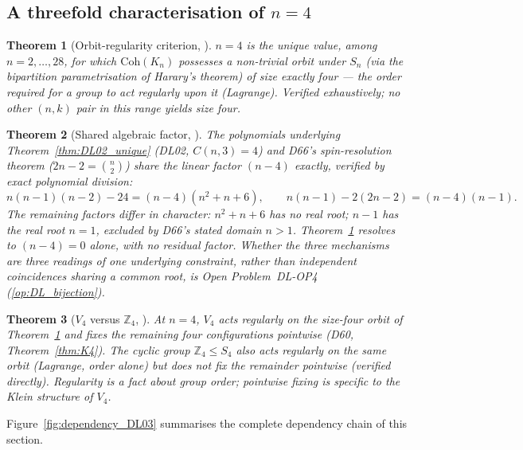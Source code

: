 \documentclass[11pt,a4paper]{article}
\theoremstyle{plain}
\newtheorem{theorem}{Theorem}[section]
\theoremstyle{definition}
\theoremstyle{remark}
\begin{document}
\subsection{A threefold characterisation of \texorpdfstring{$n=4$}{n=4}}

\begin{theorem}[Orbit-regularity criterion, \cite{DL03}]
\label{thm:DL03_orbit}
$n=4$ is the unique value, among $n=2,\ldots,28$, for which $\mathrm{Coh}(K_n)$ possesses a non-trivial orbit under $S_n$ (via the bipartition parametrisation of Harary's theorem) of size exactly four --- the order required for a group to act regularly upon it (Lagrange). Verified exhaustively; no other $(n,k)$ pair in this range yields size four.
\end{theorem}

\begin{theorem}[Shared algebraic factor, \cite{DL03}]
\label{thm:DL03_factorisation}
The polynomials underlying Theorem~\ref{thm:DL02_unique} (DL02, $C(n,3)=4$) and D66's spin-resolution theorem ($2n-2=\binom n2$) share the linear factor $(n-4)$ exactly, verified by exact polynomial division:
\begin{equation}
n(n-1)(n-2)-24 = (n-4)(n^2+n+6), \qquad n(n-1)-2(2n-2) = (n-4)(n-1).
\end{equation}
The remaining factors differ in character: $n^2+n+6$ has no real root; $n-1$ has the real root $n=1$, excluded by D66's stated domain $n>1$. Theorem~\ref{thm:DL03_orbit} resolves to $(n-4)=0$ alone, with no residual factor. Whether the three mechanisms are three readings of one underlying constraint, rather than independent coincidences sharing a common root, is Open Problem~DL-OP4 (\ref{op:DL_bijection}).
\end{theorem}

\begin{theorem}[\texorpdfstring{$V_4$}{V4} versus \texorpdfstring{$\mathbb{Z}_4$}{Z4}, \cite{DL03}]
\label{thm:DL03_v4z4}
At $n=4$, $V_4$ acts regularly on the size-four orbit of Theorem~\ref{thm:DL03_orbit} and fixes the remaining four configurations pointwise (D60, Theorem~\ref{thm:K4}). The cyclic group $\mathbb{Z}_4\le S_4$ also acts regularly on the same orbit (Lagrange, order alone) but does \emph{not} fix the remainder pointwise (verified directly). Regularity is a fact about group order; pointwise fixing is specific to the Klein structure of $V_4$.
\end{theorem}

Figure~\ref{fig:dependency_DL03} summarises the complete dependency chain of this section.
\end{document}
